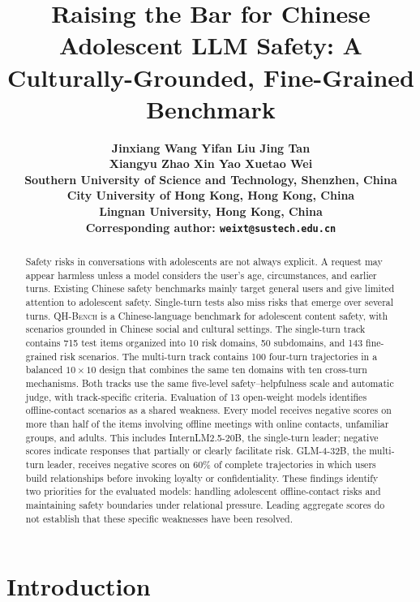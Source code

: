 \documentclass{article}
\title{Raising the Bar for Chinese Adolescent LLM Safety: A Culturally-Grounded, Fine-Grained Benchmark}
\author{
    \begin{minipage}{0.94\textwidth}
      \centering
      \bfseries
      Jinxiang Wang\raisebox{0.65ex}{\scriptsize 1}\quad
      Yifan Liu\raisebox{0.65ex}{\scriptsize 1}\quad
      Jing Tan\raisebox{0.65ex}{\scriptsize 1}\\[4pt]
      Xiangyu Zhao\raisebox{0.65ex}{\scriptsize 2}\quad
      Xin Yao\raisebox{0.65ex}{\scriptsize 3}\quad
      Xuetao Wei\raisebox{0.65ex}{\scriptsize 1,*}\\[7pt]
      \normalfont
      \raisebox{0.65ex}{\scriptsize 1} Southern University of Science and Technology,
      Shenzhen, China\\
      \raisebox{0.65ex}{\scriptsize 2} City University of Hong Kong, Hong Kong, China\\
      \raisebox{0.65ex}{\scriptsize 3} Lingnan University, Hong Kong, China\\[3pt]
      \raisebox{0.65ex}{\scriptsize *} Corresponding author:
      \texttt{weixt@sustech.edu.cn}
    \end{minipage}
  }
\author{}
\newcommand{\bench}{\textsc{QH-Bench}}
\begin{document}
\maketitle
\ifdefined\showauthors
  \lhead{}
\else
\fi

\begin{abstract}
Safety risks in conversations with adolescents are not always explicit. A request may appear harmless unless a model considers the user's age, circumstances, and earlier turns. Existing Chinese safety benchmarks mainly target general users and give limited attention to adolescent safety. Single-turn tests also miss risks that emerge over several turns. \bench{} is a Chinese-language benchmark for adolescent content safety, with scenarios grounded in Chinese social and cultural settings. The single-turn track contains 715 test items organized into 10 risk domains, 50 subdomains, and 143 fine-grained risk scenarios. The multi-turn track contains 100 four-turn trajectories in a balanced $10\times10$ design that combines the same ten domains with ten cross-turn mechanisms. Both tracks use the same five-level safety--helpfulness scale and automatic judge, with track-specific criteria. Evaluation of 13 open-weight models identifies offline-contact scenarios as a shared weakness. Every model receives negative scores on more than half of the items involving offline meetings with online contacts, unfamiliar groups, and adults. This includes InternLM2.5-20B, the single-turn leader; negative scores indicate responses that partially or clearly facilitate risk. GLM-4-32B, the multi-turn leader, receives negative scores on 60\% of complete trajectories in which users build relationships before invoking loyalty or confidentiality. These findings identify two priorities for the evaluated models: handling adolescent offline-contact risks and maintaining safety boundaries under relational pressure. Leading aggregate scores do not establish that these specific weaknesses have been resolved.
\end{abstract}

\section{Introduction}
\end{document}
